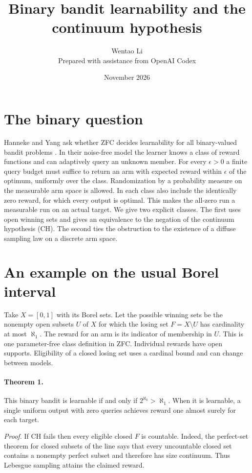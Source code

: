 \documentclass[11pt]{article}
\title{Binary bandit learnability and the continuum hypothesis}
\author{Wentao Li\\[2pt]\small Prepared with assistance from OpenAI Codex}
\date{November 2026}
\begin{document}
\maketitle
\section{The binary question}
Hanneke and Yang ask whether ZFC decides learnability for all binary-valued bandit problems \cite[\S7]{hy}. In their noise-free model the learner knows a class of reward functions and can adaptively query an unknown member. For every $\epsilon>0$ a finite query budget must suffice to return an arm with expected reward within $\epsilon$ of the optimum, uniformly over the class. Randomization by a probability measure on the measurable arm space is allowed. In each class also include the identically zero reward, for which every output is optimal. This makes the all-zero run a measurable run on an actual target. We give two explicit classes. The first uses open winning sets and gives an equivalence to the negation of the continuum hypothesis (CH). The second ties the obstruction to the existence of a diffuse sampling law on a discrete arm space.

\section{An example on the usual Borel interval}
Take $X=[0,1]$ with its Borel sets. Let the possible winning sets be the nonempty open subsets $U$ of $X$ for which the losing set $F=X\setminus U$ has cardinality at most $\aleph_1$. The reward for an arm is its indicator of membership in $U$. This is one parameter-free class definition in ZFC. Individual rewards have open supports. Eligibility of a closed losing set uses a cardinal bound and can change between models.

\paragraph{Theorem 1.} This binary bandit is learnable if and only if $2^{\aleph_0}>\aleph_1$. When it is learnable, a single uniform output with zero queries achieves reward one almost surely for each target.

\emph{Proof.} If CH fails then every eligible closed $F$ is countable. Indeed, the perfect-set theorem for closed subsets of the line says that every uncountable closed set contains a nonempty perfect subset and therefore has size continuum. Thus Lebesgue sampling attains the claimed reward.
\end{document}

